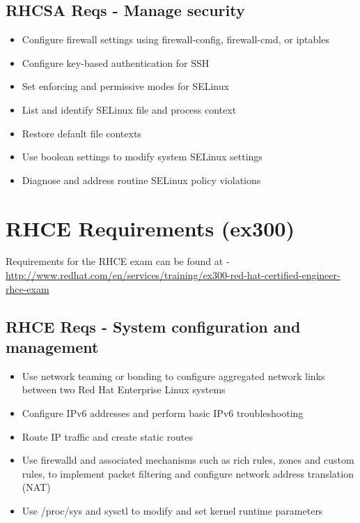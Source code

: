 \documentclass[letterpaper,10pt,english]{sphinxmanual}
\begin{document}
\subsection{RHCSA Reqs - Manage security}
\label{intro:rhcsa-reqs-manage-security}\begin{itemize}
\item {} 
Configure firewall settings using firewall-config, firewall-cmd, or iptables

\item {} 
Configure key-based authentication for SSH

\item {} 
Set enforcing and permissive modes for SELinux

\item {} 
List and identify SELinux file and process context

\item {} 
Restore default file contexts

\item {} 
Use boolean settings to modify system SELinux settings

\item {} 
Diagnose and address routine SELinux policy violations

\end{itemize}


\section{RHCE Requirements (ex300)}
\label{intro:rhce-requirements-ex300}
Requirements for the RHCE exam can be found at -
\href{http://www.redhat.com/en/services/training/ex300-red-hat-certified-engineer-rhce-exam}{http://www.redhat.com/en/services/training/ex300-red-hat-certified-engineer-rhce-exam}


\subsection{RHCE Reqs - System configuration and management}
\label{intro:rhce-reqs-system-configuration-and-management}\begin{itemize}
\item {} 
Use network teaming or bonding to configure aggregated network links between two Red Hat Enterprise Linux systems

\item {} 
Configure IPv6 addresses and perform basic IPv6 troubleshooting

\item {} 
Route IP traffic and create static routes

\item {} 
Use firewalld and associated mechanisms such as rich rules, zones and custom rules, to implement packet filtering and configure network address translation (NAT)

\item {} 
Use /proc/sys and sysctl to modify and set kernel runtime parameters

\end{itemize}
\end{document}
